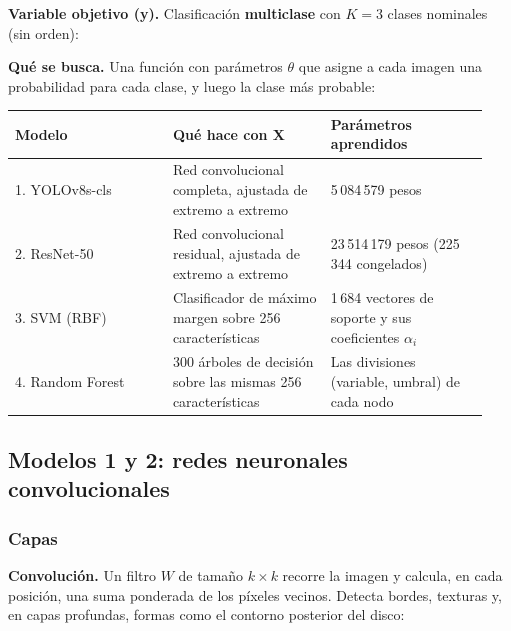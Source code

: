 \textbf{Variable objetivo (y).} Clasificación \textbf{multiclase} con $K = 3$ clases nominales (sin orden):

\begin{center}
\end{center}

\textbf{Qué se busca.} Una función con parámetros $\theta$ que asigne a cada imagen una probabilidad para cada clase, y luego la clase más probable:

\begin{center}
\end{center}

\begin{table}[htbp]
\centering\small
\begin{tabular}{p{0.313\linewidth}p{0.313\linewidth}p{0.313\linewidth}}
\toprule
Modelo & Qué hace con X & Parámetros aprendidos \\
\midrule
1. YOLOv8s-cls & Red convolucional completa, ajustada de extremo a extremo & 5\,084\,579 pesos \\
2. ResNet-50 & Red convolucional residual, ajustada de extremo a extremo & 23\,514\,179 pesos (225\,344 congelados) \\
3. SVM (RBF) & Clasificador de máximo margen sobre 256 características & 1\,684 vectores de soporte y sus coeficientes $\alpha_i$ \\
4. Random Forest & 300 árboles de decisión sobre las mismas 256 características & Las divisiones (variable, umbral) de cada nodo \\
\bottomrule
\end{tabular}
\end{table}



\subsection{Modelos 1 y 2: redes neuronales convolucionales}
\label{mm:2}

\subsubsection{Capas}
\label{mm:2.1}
\textbf{Convolución.} Un filtro $W$ de tamaño $k \times k$ recorre la imagen y calcula, en cada posición, una suma ponderada de los píxeles vecinos. Detecta bordes, texturas y, en capas profundas, formas como el contorno posterior del disco:

